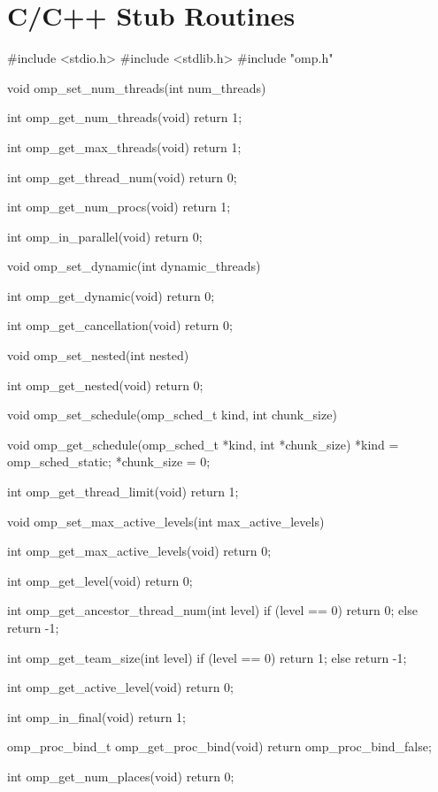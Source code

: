 \section{C/C++ Stub Routines}
\label{sec:C/C++ Stub Routines}
{\small \begin{ompcFunction}
#include <stdio.h>
#include <stdlib.h>
#include "omp.h"

void omp_set_num_threads(int num_threads)
{
}

int omp_get_num_threads(void)
{
  return 1;
}

int omp_get_max_threads(void)
{
  return 1;
}

int omp_get_thread_num(void)
{
  return 0;
}

int omp_get_num_procs(void)
{
  return 1;
}

int omp_in_parallel(void)
{
  return 0;
}

void omp_set_dynamic(int dynamic_threads)
{
}

int omp_get_dynamic(void)
{
  return 0;
}

int omp_get_cancellation(void)
{
  return 0;
}

void omp_set_nested(int nested)
{
}

int omp_get_nested(void)
{
  return 0;
}

void omp_set_schedule(omp_sched_t kind, int chunk_size)
{
}

void omp_get_schedule(omp_sched_t *kind, int *chunk_size)
{
  *kind = omp_sched_static;
  *chunk_size = 0;
}

int omp_get_thread_limit(void)
{
  return 1;
}

void omp_set_max_active_levels(int max_active_levels)
{
}

int omp_get_max_active_levels(void)
{
  return 0;
}

int omp_get_level(void)
{
  return 0;
}

int omp_get_ancestor_thread_num(int level)
{
  if (level == 0)
  {
    return 0;
  }
  else
  {
    return -1;
  }
}

int omp_get_team_size(int level)
{
  if (level == 0)
  {
    return 1;
  }
  else
  {
    return -1;
  }
}

int omp_get_active_level(void)
{
  return 0;
}

int omp_in_final(void)
{
  return 1;
}

omp_proc_bind_t omp_get_proc_bind(void)
{
  return omp_proc_bind_false;
}

int omp_get_num_places(void)
{
  return 0;
}


\end{ompcFunction}}
